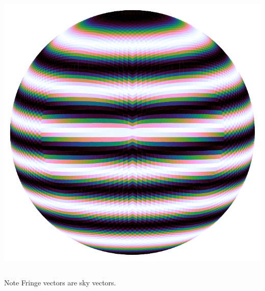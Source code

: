 \documentclass[ignorenonframetext]{beamer}
\begin{document}
\begin{frame}
\begin{columns}
\begin{column}{0.5\linewidth}
\begin{center}
\includegraphics[width=0.45\linewidth]{fig/harmonic_uvw_3.pdf}
\end{center}  
 \end{column}
\end{columns}
\begin{block}{Note}
 Fringe vectors are sky vectors.
\end{block}
\end{frame}
\end{document}
